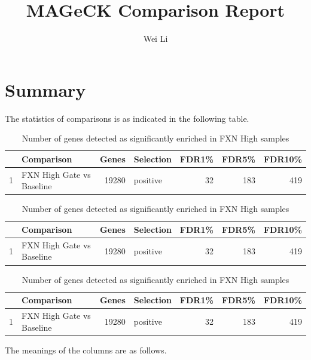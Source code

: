 \documentclass{article}
\begin{document}


\title{MAGeCK Comparison Report}
\author{Wei Li}

\maketitle


\tableofcontents

\section{Summary}


The statistics of comparisons is as indicated in the following table. 

\begin{table}[ht]
\centering
\begin{tabular}{rlrlrrr}
  \hline
 & Comparison & Genes & Selection & FDR1\% & FDR5\% & FDR10\% \\ 
  \hline
1 & FXN High Gate vs Baseline & 19280 & positive & 32 & 183 & 419 \\ 
   \hline
\end{tabular}
\caption{Number of genes detected as significantly enriched in FXN High samples} 
\label{tab:one}
\end{table}%
\begin{table}[ht]
\centering
\begin{tabular}{rlrlrrr}
  \hline
 & Comparison & Genes & Selection & FDR1\% & FDR5\% & FDR10\% \\ 
  \hline
1 & FXN High Gate vs Baseline & 19280 & positive & 32 & 183 & 419 \\ 
   \hline
\end{tabular}
\caption{Number of genes detected as significantly enriched in FXN High samples} 
\label{tab:one}
\end{table}%
\begin{table}[ht]
\centering
\begin{tabular}{rlrlrrr}
  \hline
 & Comparison & Genes & Selection & FDR1\% & FDR5\% & FDR10\% \\ 
  \hline
1 & FXN High Gate vs Baseline & 19280 & positive & 32 & 183 & 419 \\ 
   \hline
\end{tabular}
\caption{Number of genes detected as significantly enriched in FXN High samples} 
\label{tab:one}
\end{table}
The meanings of the columns are as follows.
\end{document}
